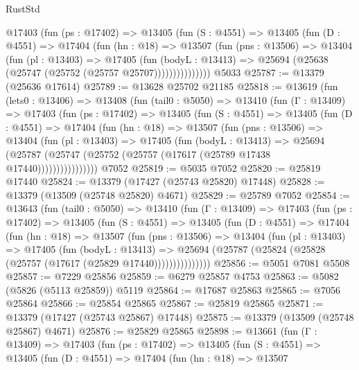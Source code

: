 \begin{lexlean}{RustStd}
\begin{coremodule}
          @17403
            (fun (ps : @17402) =>
            @13405
              (fun (S : @4551) =>
              @13405
                (fun (D : @4551) =>
                @17404
                  (fun (hn : @18) =>
                  @13507
                    (fun (pns : @13506) =>
                    @13404
                      (fun (pl : @13403) =>
                      @17405
                        (fun (bodyL : @13413) =>
                        @25694 (@25638 (@25747 (@25752 (@25757 @25707)))))))))))))))
    @5033
@25787 := @13379 (@25636 @17614)
@25789 := @13628 @25702 @21185
@25818 := @13619
    (fun (lets0 : @13406) =>
    @13408
      (fun (tail0 : @5050) =>
      @13410
        (fun (Γ : @13409) =>
        @17403
          (fun (ps : @17402) =>
          @13405
            (fun (S : @4551) =>
            @13405
              (fun (D : @4551) =>
              @17404
                (fun (hn : @18) =>
                @13507
                  (fun (pns : @13506) =>
                  @13404
                    (fun (pl : @13403) =>
                    @17405
                      (fun (bodyL : @13413) =>
                      @25694
                        (@25787
                          (@25747 (@25752 (@25757 (@17617 (@25789 @17438 @17440))))))))))))))))
    @7052
@25819 := @5035 @7052
@25820 := @25819 @17440
@25824 := @13379 (@17427 (@25743 @25820) @17448)
@25828 := @13379 (@13509 (@25748 @25820) @4671)
@25829 := @25789 @7052
@25854 := @13643
    (fun (tail0 : @5050) =>
    @13410
      (fun (Γ : @13409) =>
      @17403
        (fun (ps : @17402) =>
        @13405
          (fun (S : @4551) =>
          @13405
            (fun (D : @4551) =>
            @17404
              (fun (hn : @18) =>
              @13507
                (fun (pns : @13506) =>
                @13404
                  (fun (pl : @13403) =>
                  @17405
                    (fun (bodyL : @13413) =>
                    @25694 (@25787 (@25824 (@25828 (@25757 (@17617 (@25829 @17440)))))))))))))))
@25856 := @5051 @7081 @5508
@25857 := @7229 @25856
@25859 := @6279 @25857 @4753
@25863 := @5082 (@5826 (@5113 @25859)) @5119
@25864 := @17687 @25863
@25865 := @7056 @25864
@25866 := @25854 @25865
@25867 := @25819 @25865
@25871 := @13379 (@17427 (@25743 @25867) @17448)
@25875 := @13379 (@13509 (@25748 @25867) @4671)
@25876 := @25829 @25865
@25898 := @13661
    (fun (Γ : @13409) =>
    @17403
      (fun (ps : @17402) =>
      @13405
        (fun (S : @4551) =>
        @13405
          (fun (D : @4551) =>
          @17404
            (fun (hn : @18) =>
            @13507

\end{coremodule}
\end{lexlean}
